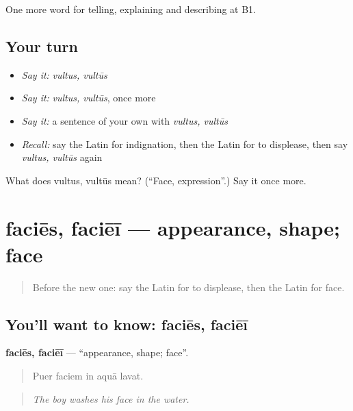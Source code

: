 \begin{grammarlens}[title={What you've built}]
One more word for telling, explaining and describing at B1.
\end{grammarlens}

\subsection*{Your turn}
\begin{itemize}
\raggedright
  \item \emph{Say it:} \emph{vultus, vultūs}
  \item \emph{Say it:} \emph{vultus, vultūs}, once more
  \item \emph{Say it:} a sentence of your own with \emph{vultus, vultūs}
  \item \emph{Recall:} say the Latin for indignation, then the Latin for to displease, then say \emph{vultus, vultūs} again
\end{itemize}

\begin{tcolorbox}[breakable,colback=teal!4,colframe=teal!35!black,title={Before you move on}]
What does vultus, vultūs mean? (\textquotedblleft{}Face, expression\textquotedblright{}.) Say it once more.
\end{tcolorbox}
\section[faciēs, faciēī]{faciēs, faciēī — appearance, shape; face}

\label{lesson:LA-C515-facies}



\begin{quote}
Before the new one: say the Latin for to displease, then the Latin for face.
\end{quote}

\subsection*{You'll want to know: faciēs, faciēī}
\textbf{faciēs, faciēī} — \textquotedblleft{}appearance, shape; face\textquotedblright{}.

\begin{quote}
Puer faciem in aquā lavat.
\end{quote}

\begin{quote}
\emph{The boy washes his face in the water.}
\end{quote}

